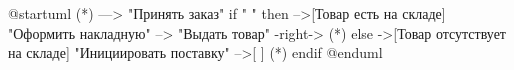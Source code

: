 @startuml 
(*) —> "Принять заказ" 
if " " then 
-->[Товар есть на складе] "Оформить накладную" 
--> "Выдать товар" 
-right-> (*) 
else 
->[Товар отсутствует на складе] "Инициировать поставку" 
-->[ ] (*) 
endif 
@enduml